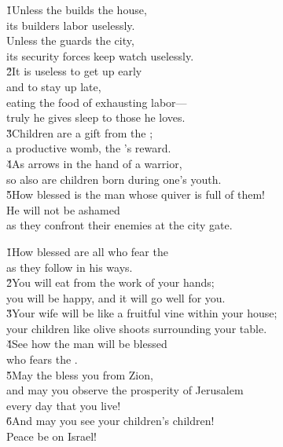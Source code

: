 \begin{poetry}
\poeml \v{1}Unless the  builds the house, \\
\poemll    its builders labor uselessly. \\
\poeml Unless the  guards the city, \\
\poemll    its security forces keep watch uselessly. \\
\poeml \v{2}It is useless to get up early \\
\poemll    and to stay up late, \\
\poeml eating the food of exhausting labor--- \\
\poemll    truly he gives sleep to those he loves. \\
\poeml \v{3}Children are a gift from the ; \\
\poemll    a productive womb, the 's reward. \\
\poeml \v{4}As arrows in the hand of a warrior, \\
\poemll    so also are children born during one's youth. \\
\poeml \v{5}How blessed is the man whose quiver is full of them! \\
\poemll    He will not be ashamed \\
\poemlll       as they confront their enemies at the city gate.
\end{poetry}

\begin{poetry}
\poeml \v{1}How blessed are all who fear the  \\
\poemll    as they follow in his ways. \\
\poeml \v{2}You will eat from the work of your hands; \\
\poemll    you will be happy, and it will go well for you. \\
\poeml \v{3}Your wife will be like a fruitful vine within your house; \\
\poemll    your children like olive shoots surrounding your table. \\
\poeml \v{4}See how the man will be blessed \\
\poemll    who fears the . \\
\poeml \v{5}May the  bless you from Zion, \\
\poemll    and may you observe the prosperity of Jerusalem \\
\poemlll       every day that you live! \\
\poeml \v{6}And may you see your children's children! \\
\poemll    Peace be on Israel!
\end{poetry}

